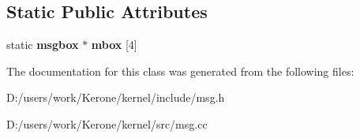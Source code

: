 \subsection*{Static Public Attributes}
\begin{DoxyCompactItemize}
\item 
\mbox{\label{classmsgbox_a34b5085aa0720e38f57b7ea191e0ba0d}} 
static \textbf{ msgbox} $\ast$ {\bfseries mbox} [4]
\end{DoxyCompactItemize}


The documentation for this class was generated from the following files\+:\begin{DoxyCompactItemize}
\item 
D\+:/users/work/\+Kerone/kernel/include/msg.\+h\item 
D\+:/users/work/\+Kerone/kernel/src/msg.\+cc\end{DoxyCompactItemize}
